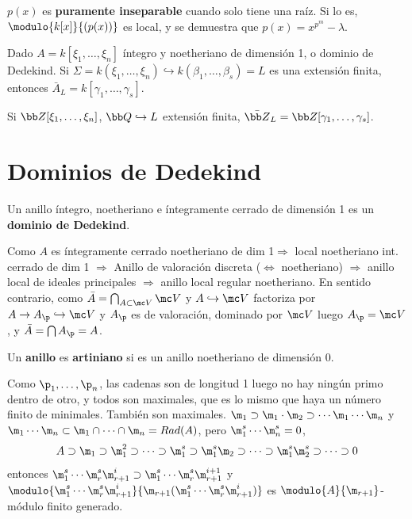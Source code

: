 \begin{defi}
    $p(x)$ es \textbf{puramente inseparable} cuando solo tiene una ra\'iz. Si lo es, $\modulo{k[x]}{(p(x))}$ es local, y se demuestra que $p(x) = x^{p^m} - \lambda$. 
\end{defi}
Dado $A = k[\xi_1, \ldots, \xi_n]$ \'integro y noetheriano de dimensi\'on 1, o dominio de Dedekind. Si $\Sigma = k(\xi_1, \ldots, \xi_n) \hookrightarrow k(\beta_1, \ldots, \beta_s) = L$ es una extensi\'on finita, entonces $\bar A_L = k [\gamma_1, \ldots, \gamma_s]$.

Si $\bb Z[\xi_1, \ldots, \xi_n]$, $\bb Q \hookrightarrow L$ extensi\'on finita, $\bar{\bb Z}_L = \bb Z[\gamma_1, \ldots, \gamma_s]$. 
\section{Dominios de Dedekind}
\begin{defi}
    Un anillo \'integro, noetheriano e \'integramente cerrado de dimensi\'on 1 es un \textbf{dominio de Dedekind}. 
\end{defi}
Como $A$ es \'integramente cerrado noetheriano de dim 1$\Rightarrow$ local noetheriano int. cerrado de dim 1 $\Rightarrow$ Anillo de valoraci\'on discreta ($\iff$ noetheriano) $\Rightarrow$ anillo local de ideales principales $\Rightarrow$ anillo local regular noetheriano. En sentido contrario, como $\bar A = \bigcap_{A \subset \mc V} \mc V$ y $A \hookrightarrow \mc V$ factoriza por $A \rightarrow A_\p \hookrightarrow \mc V$ y $A_\p$ es de valoraci\'on, dominado por $\mc V$ luego $A_\p = \mc V$, y $\bar A = \bigcap A_\p = A$. 
\begin{defi}
    Un \textbf{anillo} es \textbf{artiniano} si es un anillo noetheriano de dimensi\'on 0.
\end{defi}
Como $\p_1, \ldots, \p_n$, las cadenas son de longitud 1 luego no hay ning\'un primo dentro de otro, y todos son maximales, que es lo mismo que haya un n\'umero finito de minimales. Tambi\'en son maximales. $\m_1\supset \m_1\cdot\m_2\supset \cdots \m_1\cdots \m_n $ y $\m_1\cdots \m_n \subset \m_1 \cap \cdots \cap\m_n=Rad(A)$, pero $\m_1^s \cdots \m_n^s = 0$, 
$$A \supset \m_1 \supset \m_1^2 \supset \cdots \supset  \m_1^s \supset \m_1^s\m_2 \supset \cdots \supset \m_1^s\m_2^s\supset \cdots \supset 0$$
entonces $\m_1^s \cdots \m_r^s \m^i_{r+1} \supset \m_1^s \cdots \m_r^s \m^{i+1}_{r+1}$ y $\modulo{\m_1^s \cdots \m_r^s \m^i_{r+1}}{\m_{r+1} (\m_1^s \cdots \m_r^s \m^i_{r+1})}$ es $\modulo{A}{\m_{r+1}}$-m\'odulo finito generado. 

